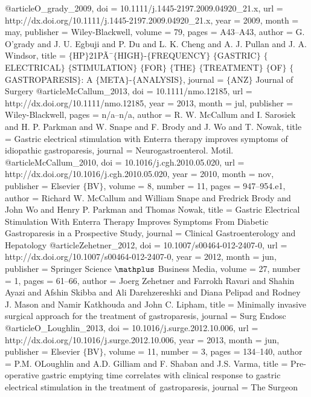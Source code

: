 @article{O_grady_2009,
	doi = {10.1111/j.1445-2197.2009.04920_21.x},
	url = {http://dx.doi.org/10.1111/j.1445-2197.2009.04920_21.x},
	year = 2009,
	month = {may},
	publisher = {Wiley-Blackwell},
	volume = {79},
	pages = {A43--A43},
	author = {G. O'grady and J. U. Egbuji and P. Du and L. K. Cheng and A. J. Pullan and J. A. Windsor},
	title = {$\lbrace$HP$\rbrace$21PÃ¯{\textquestiondown}{\textonehalf}$\lbrace$HIGH$\rbrace$-$\lbrace$FREQUENCY$\rbrace$ $\lbrace$GASTRIC$\rbrace$ $\lbrace$ELECTRICAL$\rbrace$ $\lbrace$STIMULATION$\rbrace$ $\lbrace$FOR$\rbrace$ $\lbrace$THE$\rbrace$ $\lbrace$TREATMENT$\rbrace$ $\lbrace$OF$\rbrace$ $\lbrace$GASTROPARESIS$\rbrace$: A $\lbrace$META$\rbrace$-$\lbrace$ANALYSIS$\rbrace$},
	journal = {$\lbrace$ANZ$\rbrace$ Journal of Surgery}
}
@article{McCallum_2013,
	doi = {10.1111/nmo.12185},
	url = {http://dx.doi.org/10.1111/nmo.12185},
	year = 2013,
	month = {jul},
	publisher = {Wiley-Blackwell},
	pages = {n/a--n/a},
	author = {R. W. McCallum and I. Sarosiek and H. P. Parkman and W. Snape and F. Brody and J. Wo and T. Nowak},
	title = {Gastric electrical stimulation with Enterra therapy improves symptoms of idiopathic gastroparesis},
	journal = {Neurogastroenterol. Motil.}
}
@article{McCallum_2010,
	doi = {10.1016/j.cgh.2010.05.020},
	url = {http://dx.doi.org/10.1016/j.cgh.2010.05.020},
	year = 2010,
	month = {nov},
	publisher = {Elsevier $\lbrace$BV$\rbrace$},
	volume = {8},
	number = {11},
	pages = {947--954.e1},
	author = {Richard W. McCallum and William Snape and Fredrick Brody and John Wo and Henry P. Parkman and Thomas Nowak},
	title = {Gastric Electrical Stimulation With Enterra Therapy Improves Symptoms From Diabetic Gastroparesis in a Prospective Study},
	journal = {Clinical Gastroenterology and Hepatology}
}
@article{Zehetner_2012,
	doi = {10.1007/s00464-012-2407-0},
	url = {http://dx.doi.org/10.1007/s00464-012-2407-0},
	year = 2012,
	month = {jun},
	publisher = {Springer Science $\mathplus$ Business Media},
	volume = {27},
	number = {1},
	pages = {61--66},
	author = {Joerg Zehetner and Farrokh Ravari and Shahin Ayazi and Afshin Skibba and Ali Darehzereshki and Diana Pelipad and Rodney J. Mason and Namir Katkhouda and John C. Lipham},
	title = {Minimally invasive surgical approach for the treatment of gastroparesis},
	journal = {Surg Endosc}
}
@article{O_Loughlin_2013,
	doi = {10.1016/j.surge.2012.10.006},
	url = {http://dx.doi.org/10.1016/j.surge.2012.10.006},
	year = 2013,
	month = {jun},
	publisher = {Elsevier $\lbrace$BV$\rbrace$},
	volume = {11},
	number = {3},
	pages = {134--140},
	author = {P.M. O{\textquotesingle}Loughlin and A.D. Gilliam and F. Shaban and J.S. Varma},
	title = {Pre-operative gastric emptying time correlates with clinical response to gastric electrical stimulation in the treatment of~gastroparesis},
	journal = {The Surgeon}
}
